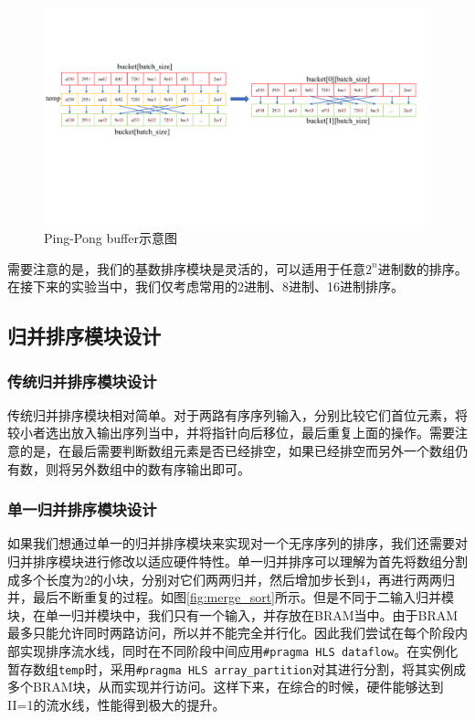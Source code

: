 \begin{figure}[htbp]
    \centering
    \includegraphics[width=\linewidth]{figures/pingpong_buffer.pdf}
    \caption{Ping-Pong buffer示意图}
    \label{fig:pingpong_buffer}
\end{figure}

需要注意的是，我们的基数排序模块是灵活的，可以适用于任意$2^n$进制数的排序。在接下来的实验当中，我们仅考虑常用的2进制、8进制、16进制排序。
\subsection{归并排序模块设计}
\subsubsection{传统归并排序模块设计}
传统归并排序模块相对简单。对于两路有序序列输入，分别比较它们首位元素，将较小者选出放入输出序列当中，并将指针向后移位，最后重复上面的操作。需要注意的是，在最后需要判断数组元素是否已经排空，如果已经排空而另外一个数组仍有数，则将另外数组中的数有序输出即可。
\subsubsection{单一归并排序模块设计}

如果我们想通过单一的归并排序模块来实现对一个无序序列的排序，我们还需要对归并排序模块进行修改以适应硬件特性。单一归并排序可以理解为首先将数组分割成多个长度为2的小块，分别对它们两两归并，然后增加步长到4，再进行两两归并，最后不断重复的过程。如图\ref{fig:merge_sort}所示。但是不同于二输入归并模块，在单一归并模块中，我们只有一个输入，并存放在BRAM当中。由于BRAM最多只能允许同时两路访问，所以并不能完全并行化。因此我们尝试在每个阶段内部实现排序流水线，同时在不同阶段中间应用\verb|#pragma HLS dataflow|。在实例化暂存数组\verb|temp|时，采用\verb|#pragma HLS array_partition|对其进行分割，将其实例成多个BRAM块，从而实现并行访问。这样下来，在综合的时候，硬件能够达到II=1的流水线，性能得到极大的提升。

